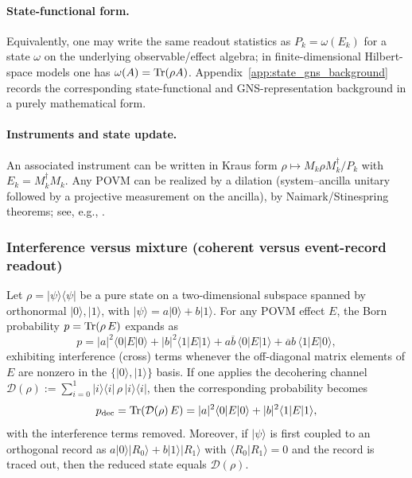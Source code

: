 \paragraph{State-functional form.}
Equivalently, one may write the same readout statistics as $P_k=\omega(E_k)$ for a state $\omega$ on the underlying observable/effect algebra; in finite-dimensional Hilbert-space models one has $\omega(A)=\mathrm{Tr}(\rho A)$.
Appendix~\ref{app:state_gns_background} records the corresponding state-functional and GNS-representation background in a purely mathematical form.

\paragraph{Instruments and state update.}
An associated instrument can be written in Kraus form $\rho\mapsto M_k\rho M_k^\dagger/P_k$ with $E_k=M_k^\dagger M_k$.
Any POVM can be realized by a dilation (system--ancilla unitary followed by a projective measurement on the ancilla), by Naimark/Stinespring theorems; see, e.g., \cite{Naimark1940,Stinespring1955,Kraus1983,NielsenChuang2000}.

\subsubsection{Interference versus mixture (coherent versus event-record readout)}
\label{subsec:z128_interference_vs_mixture}

\begin{lemma}
\label{lem:z128_interference_vs_mixture}
Let $\rho=|\psi\rangle\langle\psi|$ be a pure state on a two-dimensional subspace spanned by orthonormal $|0\rangle,|1\rangle$, with $|\psi\rangle=a|0\rangle+b|1\rangle$.
For any POVM effect $E$, the Born probability $p=\mathrm{Tr}(\rho\,E)$ expands as
\[
p
=|a|^2\langle 0|E|0\rangle
+|b|^2\langle 1|E|1\rangle
+a\overline{b}\,\langle 0|E|1\rangle
+\overline{a}b\,\langle 1|E|0\rangle,
\]
exhibiting interference (cross) terms whenever the off-diagonal matrix elements of $E$ are nonzero in the $\{|0\rangle,|1\rangle\}$ basis.
If one applies the decohering channel $\mathcal{D}(\rho):=\sum_{i=0}^1 |i\rangle\langle i|\,\rho\,|i\rangle\langle i|$, then the corresponding probability becomes
\[
p_{\mathrm{dec}}=\mathrm{Tr}(\mathcal{D}(\rho)\,E)=|a|^2\langle 0|E|0\rangle+|b|^2\langle 1|E|1\rangle,
\]
with the interference terms removed.
Moreover, if $|\psi\rangle$ is first coupled to an orthogonal record as $a|0\rangle|R_0\rangle+b|1\rangle|R_1\rangle$ with $\langle R_0|R_1\rangle=0$ and the record is traced out, then the reduced state equals $\mathcal{D}(\rho)$.
\end{lemma}

